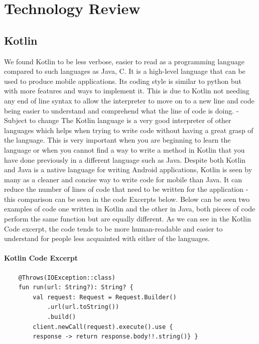\chapter{Technology Review}
\section{Kotlin}
We found Kotlin to be less verbose, easier to read as a programming language compared to such languages as Java, C. It is a high-level language that can be used to produce mobile applications. Its coding style is similar to python but with more features and ways to implement it. \newline
This is due to Kotlin not needing any end of line syntax to allow the interpreter to move on to a new line and code being easier to understand and comprehend what the line of code is doing. - Subject to change
\newline \newline
The Kotlin language is a very good interpreter of other languages which helps when trying to write code without having a great grasp of the language. This is very important when you are beginning to learn the language or when you cannot find a way to write a method in Kotlin that you have done previously in a different language such as Java.
\newline \newline
Despite both Kotlin and Java is a native language for writing Android applications, Kotlin is seen by many as a cleaner and concise way to write code for mobile than Java. It can reduce the number of lines of code that need to be written for the application - this comparison can be seen in the code Excerpts below.
\newline
\newline
Below can be seen two examples of code one written in Kotlin and the other in Java, both pieces of code perform the same function but are equally different. As we can see in the Kotlin Code excerpt, the code tends to be more human-readable and easier to understand for people less acquainted with either of the languages.
\newline

\subsubsection{Kotlin Code Excerpt}
\begin{verbatim}
    @Throws(IOException::class)
    fun run(url: String?): String? {
        val request: Request = Request.Builder()
            .url(url.toString())
            .build()
        client.newCall(request).execute().use {
        response -> return response.body!!.string()} }
\end{verbatim}
